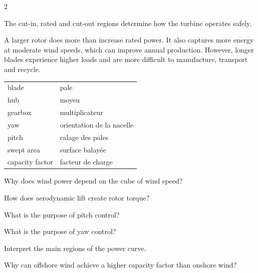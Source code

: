 \begin{multicols}{2}
\begin{tcolorbox}[title=\sffamily\bfseries Typical power curve,colback=white,colframe=ECGreen]
\centering
{}

{\scriptsize The cut-in, rated and cut-out regions determine how the turbine operates safely.}
\end{tcolorbox}

\begin{tcolorbox}[title=\sffamily\bfseries Engineering Insight,colback=white,colframe=ECOrange]
A larger rotor does more than increase rated power. It also captures more energy at moderate
wind speeds, which can improve annual production. However, longer blades experience higher
loads and are more difficult to manufacture, transport and recycle.
\end{tcolorbox}

\begin{vocabulary}
\begin{tabularx}{\linewidth}{@{}lX@{}}
blade & pale\\
hub & moyeu\\
gearbox & multiplicateur\\
yaw & orientation de la nacelle\\
pitch & calage des pales\\
swept area & surface balayée\\
capacity factor & facteur de charge
\end{tabularx}
\end{vocabulary}

\begin{questions}
\item Why does wind power depend on the cube of wind speed?
\item How does aerodynamic lift create rotor torque?
\item What is the purpose of pitch control?
\item What is the purpose of yaw control?
\item Interpret the main regions of the power curve.
\item Why can offshore wind achieve a higher capacity factor than onshore wind?
\end{questions}


\end{multicols}
